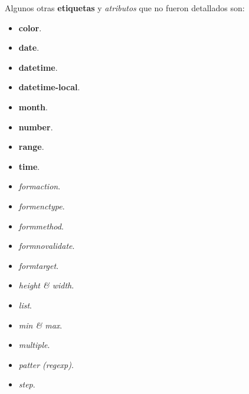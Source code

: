 Algunos otras \textbf{etiquetas} y \textit{atributos} que no fueron detallados son:
\begin{itemize}
    \item \textbf{color}.
    \item \textbf{date}.
    \item \textbf{datetime}.
    \item \textbf{datetime-local}.
    \item \textbf{month}.
    \item \textbf{number}.
    \item \textbf{range}.
    \item \textbf{time}.
    \item \textit{formaction}.
    \item \textit{formenctype}.
    \item \textit{formmethod}.
    \item \textit{formnovalidate}.
    \item \textit{formtarget}.
    \item \textit{height \& width}.
    \item \textit{list}.
    \item \textit{min \& max}.
    \item \textit{multiple}.
    \item \textit{patter (regexp)}.
    \item \textit{step}.
\end{itemize}